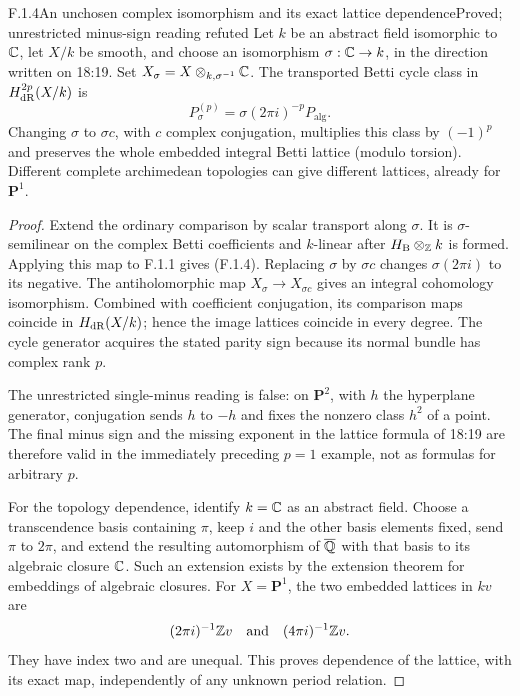 \begin{result}{F.1.4}{An unchosen complex isomorphism and its exact lattice dependence}{Proved; unrestricted minus-sign reading refuted}
Let $k$ be an abstract field isomorphic to $\mathbb C$, let $X/k$ be smooth, and choose an isomorphism $\sigma:\mathbb C\to k$, in the direction written on 18:19. Set $X_\sigma=X\otimes_{k,\sigma^{-1}}\mathbb C$. The transported Betti cycle class in $H^{2p}_{\mathrm{dR}}(X/k)$ is
\[
 P^{(p)}_\sigma=\sigma(2\pi i)^{-p}P_{\mathrm{alg}}.
 \tag{F.1.4}
\]
Changing $\sigma$ to $\sigma c$, with $c$ complex conjugation, multiplies this class by $(-1)^p$ and preserves the whole embedded integral Betti lattice (modulo torsion). Different complete archimedean topologies can give different lattices, already for $\mathbf P^1$.
\end{result}
\begin{proof}
Extend the ordinary comparison by scalar transport along $\sigma$. It is $\sigma$-semilinear on the complex Betti coefficients and $k$-linear after $H_{\mathrm B}\otimes_{\mathbb Z}k$ is formed. Applying this map to F.1.1 gives (F.1.4). Replacing $\sigma$ by $\sigma c$ changes $\sigma(2\pi i)$ to its negative. The antiholomorphic map $X_\sigma\to X_{\sigma c}$ gives an integral cohomology isomorphism. Combined with coefficient conjugation, its comparison maps coincide in $H_{\mathrm{dR}}(X/k)$; hence the image lattices coincide in every degree. The cycle generator acquires the stated parity sign because its normal bundle has complex rank $p$.

The unrestricted single-minus reading is false: on $\mathbf P^2$, with $h$ the hyperplane generator, conjugation sends $h$ to $-h$ and fixes the nonzero class $h^2$ of a point. The final minus sign and the missing exponent in the lattice formula of 18:19 are therefore valid in the immediately preceding $p=1$ example, not as formulas for arbitrary $p$.

For the topology dependence, identify $k=\mathbb C$ as an abstract field. Choose a transcendence basis containing $\pi$, keep $i$ and the other basis elements fixed, send $\pi$ to $2\pi$, and extend the resulting automorphism of $\overline{\mathbb Q}$ with that basis to its algebraic closure $\mathbb C$. Such an extension exists by the extension theorem for embeddings of algebraic closures. For $X=\mathbf P^1$, the two embedded lattices in $kv$ are
\[
 (2\pi i)^{-1}\mathbb Z v\quad\hbox{and}\quad(4\pi i)^{-1}\mathbb Z v.
\]
They have index two and are unequal. This proves dependence of the lattice, with its exact map, independently of any unknown period relation.
\end{proof}

